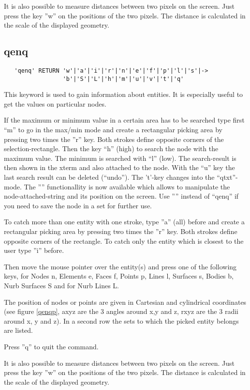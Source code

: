 \documentclass{article}
\begin{document}
It is also possible to measure distances between two pixels on the screen. Just press the key ''w'' on the positions of the two pixels. The distance is calculated in the scale of the displayed geometry.

\subsection{\label{qenq}qenq}
\begin{verbatim}
   'qenq' RETURN 'w'|'a'|'i'|'r'|'n'|'e'|'f'|'p'|'l'|'s'|->
                 'b'|'S'|'L'|'h'|'m'|'u'|'v'|'t'|'q' 
\end{verbatim}
This keyword is used to gain information about entities. It is especially useful to get the values on particular nodes.

If the maximum or minimum value in a certain area has to be searched type first ``m'' to go in the max/min mode and create a rectangular picking area by pressing two times the ''r'' key. Both strokes define opposite corners of the selection-rectangle. Then the key ``h'' (high) to search the node with the maximum value. The minimum is searched with ``l'' (low). The search-result is then shown in the xterm and also attached to the node. With the ``u'' key the last search result can be deleted (``undo''). The 't'-key changes into the ``qtxt''-mode. The '''' functionallity is now available which allows to manipulate the node-attached-string and its position on the screen. Use '''' instead of ``qenq'' if you need to save the node in a set for further use.

To catch more than one entity with one stroke, type ''a'' (all) before and create a rectangular picking area by pressing two times the ''r'' key. Both strokes define opposite corners of the rectangle. To catch only the entity which is closest to the user type ''i'' before.

Then move the mouse pointer over the entity(s) and press one of the following keys, for Nodes n, Elements e, Faces f, Points p, Lines l, Surfaces s, Bodies b, Nurb Surfaces S and for Nurb Lines L.

The position of nodes or points are given in Cartesian and cylindrical coordinates (see figure \ref{qenqp}, axyz are the 3 angles around x,y and z, rxyz are the 3 radii around x, y and z). In a second row the sets to which the picked entity belongs are listed. 

Press ''q'' to quit the command. 

It is also possible to measure distances between two pixels on the screen. Just press the key ''w'' on the positions of the two pixels. The distance is calculated in the scale of the displayed geometry.
  
\end{document}
